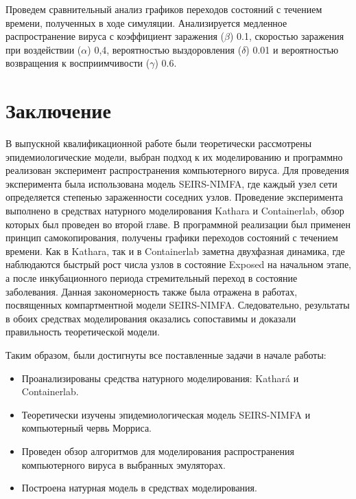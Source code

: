 \documentclass[
  english,
  russian,
  12pt,
  a4paper,
]{phdthesr}
\begin{document}
Проведем сравнительный анализ графиков переходов состояний с течением
времени, полученных в ходе симуляции. Анализируется медленное
распространение вируса с коэффициент заражения (\(\beta\)) 0.1,
скоростью заражения при воздействии (\(\alpha\)) 0,4, вероятностью
выздоровления (\(\delta\)) 0.01 и вероятностью возвращения к
восприимчивости (\(\gamma\)) 0.6.


\chapter*{Заключение}\label{ux437ux430ux43aux43bux44eux447ux435ux43dux438ux435}


В выпускной квалификационной работе были теоретически рассмотрены
эпидемиологические модели, выбран подход к их моделированию и программно
реализован эксперимент распространения компьютерного вируса. Для
проведения эксперимента была использована модель SEIRS-NIMFA, где каждый
узел сети определяется степенью зараженности соседних узлов. Проведение
эксперимента выполнено в средствах натурного моделирования Kathara и
Containerlab, обзор которых был проведен во второй главе. В программной
реализации был применен принцип самокопирования, получены графики
переходов состояний с течением времени. Как в Kathara, так и в
Containerlab заметна двухфазная динамика, где наблюдаются быстрый рост
числа узлов в состояние Exposed на начальном этапе, а после
инкубационного периода стремительный переход в состояние заболевания.
Данная закономерность также была отражена в работах, посвященных
компартментной модели SEIRS-NIMFA. Следовательно, результаты в обоих
средствах моделирования оказались сопоставимы и доказали правильность
теоретической модели.

Таким образом, были достигнуты все поставленные задачи в начале работы:

\begin{itemize}
\item
  Проанализированы средства натурного моделирования: Kathará и
  Containerlab.
\item
  Теоретически изучены эпидемиологическая модель SEIRS-NIMFA и
  компьютерный червь Морриса.
\item
  Проведен обзор алгоритмов для моделирования распространения
  компьютерного вируса в выбранных эмуляторах.
\item
  Построена натурная модель в средствах моделирования.
\end{itemize}
\end{document}
